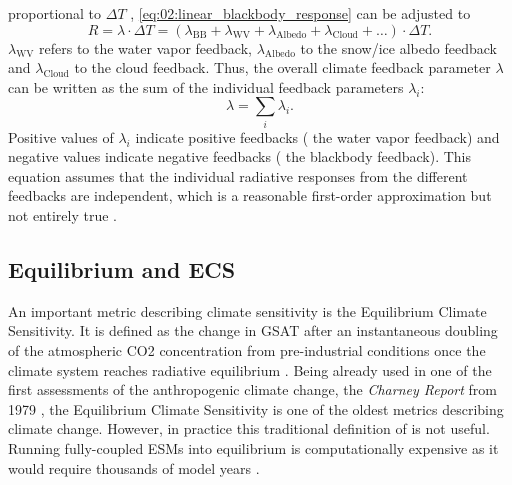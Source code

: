 proportional to $\Delta T$ \autocite{Gregory2008a},
\cref{eq:02:linear_blackbody_response} can be adjusted to
\begin{equation}
  R = \lambda \cdot \Delta T = \left( \lambda_\text{BB} + \lambda_\text{WV} +
  \lambda_\text{Albedo} + \lambda_\text{Cloud} + \ldots \right) \cdot \Delta T.
  \label{eq:02:linear_response}
\end{equation}
$\lambda_\text{WV}$ refers to the water vapor feedback, $\lambda_\text{Albedo}$
to the snow/ice albedo feedback and $\lambda_\text{Cloud}$ to the cloud
feedback. Thus, the overall climate feedback parameter $\lambda$ can be written
as the sum of the individual feedback parameters $\lambda_i$:
\begin{equation}
  \lambda = \sum_i \lambda_i.
  \label{eq:02:lambda_as_sum_of_lambdas}
\end{equation}
Positive values of $\lambda_i$ indicate positive feedbacks (\eg{} the water
vapor feedback) and negative values indicate negative feedbacks (\eg{} the
blackbody feedback). This equation assumes that the individual radiative
responses from the different feedbacks are independent, which is a reasonable
first-order approximation but not entirely true \autocite{Soden2008}.

\subsection{Equilibrium and \acl{ECS}}
\label{subsec:02:ecs}

An important metric describing climate sensitivity is the Equilibrium Climate
Sensitivity. It is defined as the change in \ac{GSAT} after an instantaneous
doubling of the atmospheric \ac{CO2} concentration from pre-industrial
conditions once the climate system reaches radiative equilibrium
\autocite{Bindoff2013}. Being already used in one of the first assessments of
the anthropogenic climate change, the \emph{Charney Report} from 1979
\autocite{Charney1979}, the Equilibrium Climate Sensitivity is one of the
oldest metrics describing climate change. However, in practice this traditional
definition of is not useful. Running fully-coupled \acp{ESM} into equilibrium
is computationally expensive as it would require thousands of model years
\autocite{Rugenstein2020}.


